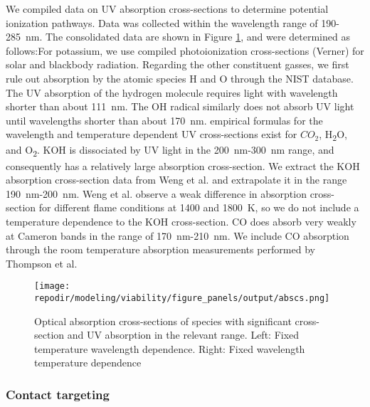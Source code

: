 We compiled data on UV absorption cross-sections to determine potential ionization pathways. Data was collected within the wavelength range of 190-\SI{285}{\nano\meter}. The consolidated data are shown in Figure \ref{fig:SI_UV_abscs}, and were determined as follows:For potassium, we use compiled photoionization cross-sections (Verner) for solar and blackbody radiation.\cite{huebnerPhotoionizationPhotodissociationRates2015} Regarding the other constituent gasses, we first rule out absorption by the atomic species H and O through the NIST database.\cite{sansonettiHandbookBasicAtomic2005} The UV absorption of the hydrogen molecule requires light with wavelength shorter than about \SI{111}{\nano\meter}.\cite{franceFARULTRAVIOLETMOLECULARHYDROGEN} The OH radical similarly does not absorb UV light until wavelengths shorter than about \SI{170}{\nano\meter}.\cite{chipmanAbsorptionSpectrumOH2008} empirical formulas for the wavelength and temperature dependent UV cross-sections exist for $CO_2$\cite{oehlschlaegerUltravioletAbsorptionCrosssections2004}, H\textsubscript{2}O,\cite{zuevUVABSORPTIONCROSS} and O\textsubscript{2}.\cite{zuevUVABSORPTIONCROSS} KOH is dissociated by UV light in the \SI{200}{\nano\meter}-\SI{300}{\nano\meter} range, and consequently has a relatively large absorption cross-section. We extract the KOH absorption cross-section data from Weng et al. and extrapolate it in the range \SI{190}{\nano\meter}-\SI{200}{\nano\meter}.\cite{wengUltravioletAbsorptionCross2019} Weng et al. observe a weak difference in absorption cross-section for different flame conditions at 1400 and \SI{1800}{\kelvin}, so we do not include a temperature dependence to the KOH cross-section. CO does absorb very weakly at Cameron bands in the range of \SI{170}{\nano\meter}-\SI{210}{\nano\meter}. We include CO absorption through the room temperature absorption measurements performed by Thompson et al.\cite{thompsonUltravioletAbsorptionCoefficients1963} 


\begin{figure}[h]
    \centering
    \texttt{[image: \\repodir/modeling/viability/figure\_panels/output/abscs.png]} 
    \caption{Optical absorption cross-sections of species with significant cross-section and UV absorption in the relevant range. Left: Fixed temperature wavelength dependence. Right: Fixed wavelength temperature dependence}
    \label{fig:SI_UV_abscs}
\end{figure}


\subsubsection{Contact targeting}


